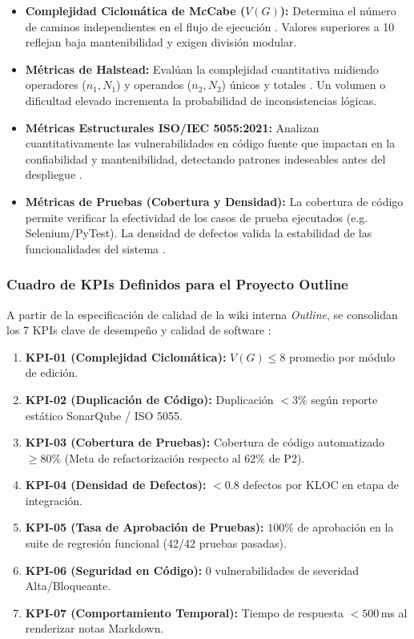 \documentclass[12pt, letterpaper]{article}
\begin{document}
\begin{itemize}
    \item \textbf{Complejidad Ciclomática de McCabe ($V(G)$):} Determina el número de caminos independientes en el flujo de ejecución \cite{mccabe1976}. Valores superiores a 10 reflejan baja mantenibilidad y exigen división modular.
    \item \textbf{Métricas de Halstead:} Evalúan la complejidad cuantitativa midiendo operadores ($n_1, N_1$) y operandos ($n_2, N_2$) únicos y totales \cite{galin2018}. Un volumen o dificultad elevado incrementa la probabilidad de inconsistencias lógicas.
    \item \textbf{Métricas Estructurales ISO/IEC 5055:2021:} Analizan cuantitativamente las vulnerabilidades en código fuente que impactan en la confiabilidad y mantenibilidad, detectando patrones indeseables antes del despliegue \cite{iso5055}.
    \item \textbf{Métricas de Pruebas (Cobertura y Densidad):} La cobertura de código permite verificar la efectividad de los casos de prueba ejecutados (e.g. Selenium/PyTest). La densidad de defectos valida la estabilidad de las funcionalidades del sistema \cite{istqb2024}.
\end{itemize}

\subsubsection{Cuadro de KPIs Definidos para el Proyecto Outline}

A partir de la especificación de calidad de la wiki interna \textit{Outline}, se consolidan los 7 KPIs clave de desempeño y calidad de software \cite{pressman2020}:

\begin{enumerate}
    \item \textbf{KPI-01 (Complejidad Ciclomática):} $V(G) \le 8$ promedio por módulo de edición.
    \item \textbf{KPI-02 (Duplicación de Código):} Duplicación $< 3\%$ según reporte estático SonarQube / ISO 5055.
    \item \textbf{KPI-03 (Cobertura de Pruebas):} Cobertura de código automatizado $\ge 80\%$ (Meta de refactorización respecto al $62\%$ de P2).
    \item \textbf{KPI-04 (Densidad de Defectos):} $< 0.8$ defectos por KLOC en etapa de integración.
    \item \textbf{KPI-05 (Tasa de Aprobación de Pruebas):} $100\%$ de aprobación en la suite de regresión funcional (42/42 pruebas pasadas).
    \item \textbf{KPI-06 (Seguridad en Código):} 0 vulnerabilidades de severidad Alta/Bloqueante.
    \item \textbf{KPI-07 (Comportamiento Temporal):} Tiempo de respuesta $< 500$\,ms al renderizar notas Markdown.
\end{enumerate}
\end{document}
